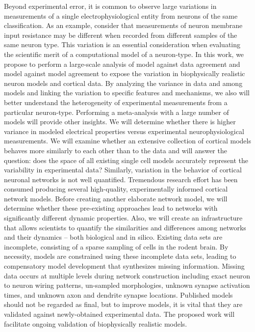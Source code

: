 Beyond experimental error, it is common to observe large variations in measurements of a single electrophysiological entity from neurons of the same classification. As an example, consider that measurements of neuron membrane input resistance may be different when recorded from different samples of the same neuron type. This variation is an essential consideration when evaluating the scientific merit of a computational model of a neuron-type. In this work, we propose to perform a large-scale analysis of model against data agreement and model against model agreement to expose the variation in biophysically realistic neuron models and cortical data. By analyzing the variance in data and among models and linking the variation to specific features and mechanisms, we also will better understand the heterogeneity of experimental measurements from a particular neuron-type. Performing a meta-analysis with a large number of models will provide other insights. We will determine whether there is higher variance in modeled electrical properties versus experimental neurophysiological measurements. We will examine whether an extensive collection of cortical models behaves more similarly to each other than to the data and will answer the question: does the space of all existing single cell models accurately represent the variability in experimental data?
Similarly, variation in the behavior of cortical neuronal networks is not well quantified. Tremendous research effort has been consumed producing several high-quality, experimentally informed cortical network models. Before creating another elaborate network model, we will determine whether these pre-existing approaches lead to networks with significantly different dynamic properties. Also, we will create an infrastructure that allows scientists to quantify the similarities and differences among networks and their dynamics – both biological and in silico.\newline
\newline
Existing data sets are incomplete, consisting of a sparse sampling of cells in the rodent brain. By necessity, models are constrained using these incomplete data sets, leading to compensatory model development that synthesizes missing information. Missing data occurs at multiple levels during network construction including exact neuron to neuron wiring patterns, un-sampled morphologies, unknown synapse activation times, and unknown axon and dendrite synapse locations. Published models should not be regarded as final, but to improve models, it is vital that they are validated against newly-obtained experimental data. The proposed work will facilitate ongoing validation of biophysically realistic models. 
